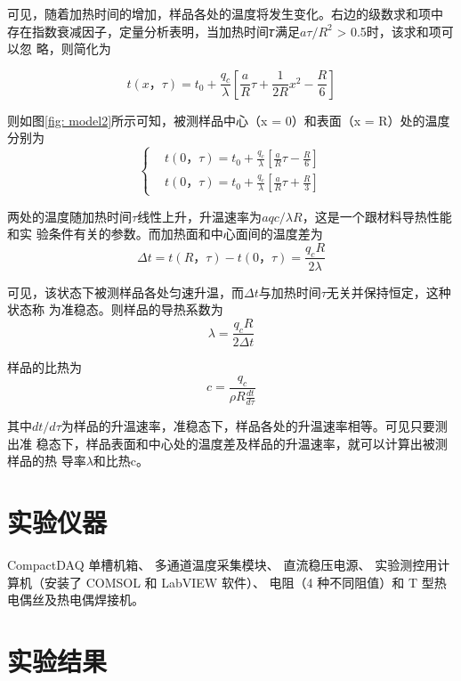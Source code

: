 \documentclass[10pt,a4paper,twoside,UTF8]{ctexart}
\begin{document}
可见，随着加热时间的增加，样品各处的温度将发生变化。右边的级数求和项中
存在指数衰减因子，定量分析表明，当加热时间𝜏满足$a\tau/R^2$ > 0.5时，该求和项可以忽
略，则简化为

\begin{equation*}
	t(x，\tau)=t_0+\frac{q_c}{\lambda}\left[\frac{a}{R}\tau +\frac{1}{2R}x^2-\frac{R}{6}\right]
\end{equation*}

则如图\ref{fig: model2}所示可知，被测样品中心（x = 0）和表面（x = R）处的温度分别为
\[\left\{
\begin{aligned}
&t(0，\tau)=t_0+\frac{q_c}{\lambda}\left[\frac{a}{R}\tau -\frac{R}{6}\right]\\
&t(0，\tau)=t_0+\frac{q_c}{\lambda}\left[\frac{a}{R}\tau +\frac{R}{3}\right]
\end{aligned}
\right.
\]

两处的温度随加热时间$\tau$线性上升，升温速率为$aqc/\lambda R$，这是一个跟材料导热性能和实
验条件有关的参数。而加热面和中心面间的温度差为
\begin{equation*}
	\varDelta t=t(R，\tau)-t(0，\tau)=\frac{q_c R}{2\lambda}
\end{equation*}

可见，该状态下被测样品各处匀速升温，而$\varDelta t$与加热时间$\tau$无关并保持恒定，这种状态称
为准稳态。则样品的导热系数为
\begin{equation*}
	\lambda = \frac{q_c R}{2 \varDelta t}
\end{equation*}

样品的比热为
\begin{equation*}
	c=\frac{q_c}{\rho R \frac{dt}{d\tau}}
\end{equation*}

其中$dt/d\tau$为样品的升温速率，准稳态下，样品各处的升温速率相等。可见只要测出准
稳态下，样品表面和中心处的温度差及样品的升温速率，就可以计算出被测样品的热
导率$\lambda$和比热c。

\section{实验仪器}
CompactDAQ 单槽机箱、
多通道温度采集模块、
直流稳压电源、
实验测控用计算机（安装了 COMSOL 和 LabVIEW 软件）、
电阻（4 种不同阻值）和
T 型热电偶丝及热电偶焊接机。

\section{实验结果}
\end{document}
